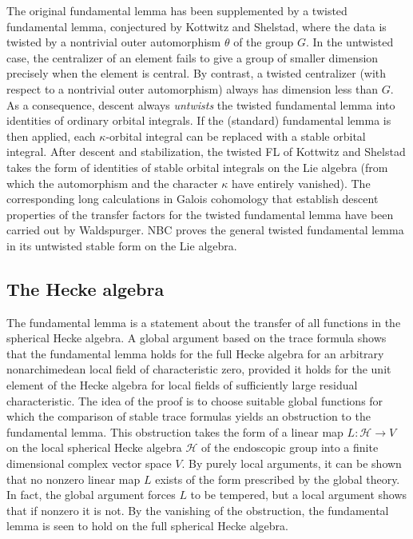 \documentclass[brochure,english,12pt]{bourbaki}
\begin{document}
The original fundamental lemma has been supplemented by a twisted
fundamental lemma, conjectured by Kottwitz and Shelstad, where the
data is twisted by a nontrivial outer automorphism $\theta$ of the
group $G$.  In the untwisted case, the centralizer of an element fails
to give a group of smaller dimension precisely when the element is
central.  By contrast, a twisted centralizer (with respect to a
nontrivial outer automorphism) always has dimension less than $G$.  As
a consequence, descent always {\it untwists} the twisted fundamental
lemma into identities of ordinary orbital integrals.  If the
(standard) fundamental lemma is then applied, each $\kappa$-orbital
integral can be replaced with a stable orbital integral.  After
descent and stabilization, the twisted FL of Kottwitz and Shelstad
takes the form of identities of stable orbital integrals on the Lie
algebra (from which the automorphism and the character $\kappa$ have
entirely vanished).  The corresponding long calculations in Galois
cohomology that establish descent properties of the transfer factors
for the twisted fundamental lemma have been carried out by
Waldspurger.  NBC proves the general twisted fundamental lemma in
its untwisted stable form on the Lie algebra.


\subsection{The Hecke algebra}

The fundamental lemma is a statement about the transfer of all
functions in the spherical Hecke algebra.  A global argument based on
the trace formula shows that the fundamental lemma holds for the full
Hecke algebra for an arbitrary nonarchimedean local field of
characteristic zero, provided it holds for the unit element of the
Hecke algebra for local fields of sufficiently large residual
characteristic.  The idea of the proof is to choose suitable global
functions for which the comparison of stable trace formulas yields an
obstruction to the fundamental lemma.  This obstruction takes the form
of a linear map $L:{\mathcal H}\to V$ on the local spherical Hecke
algebra ${\mathcal H}$ of the endoscopic group into a finite
dimensional complex vector space $V$.  By purely local arguments, it
can be shown that no nonzero linear map $L$ exists of the form
prescribed by the global theory.  In fact, the global argument forces $L$
to be tempered, but a local argument shows that if nonzero it is not.
By the vanishing of the obstruction,
the fundamental lemma is seen to hold on the full spherical Hecke algebra.
\end{document}
